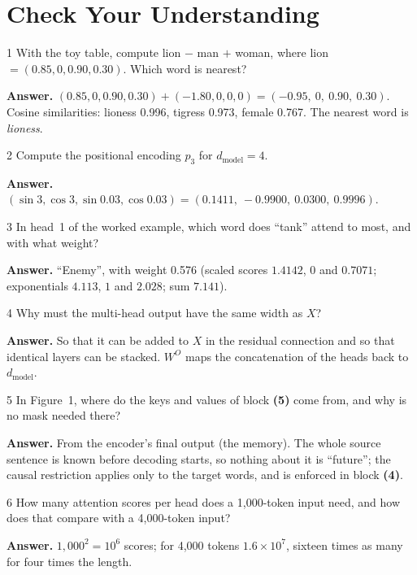 \documentclass[11pt]{article}
\newcommand{\blk}[1]{\textbf{(#1)}}
\begin{document}
\section{Check Your Understanding}
\begin{question}{1}
With the toy table, compute lion $-$ man $+$ woman, where lion $=(0.85,0,0.90,0.30)$. Which word is nearest?
\end{question}
\textbf{Answer.} $(0.85,0,0.90,0.30)+(-1.80,0,0,0)=(-0.95,\ 0,\ 0.90,\ 0.30)$. Cosine similarities: lioness 0.996, tigress 0.973, female 0.767. The nearest word is \emph{lioness}.

\begin{question}{2}
Compute the positional encoding $p_3$ for $d_{\text{model}}=4$.
\end{question}
\textbf{Answer.} $(\sin3,\cos3,\sin0.03,\cos0.03)=(0.1411,\ -0.9900,\ 0.0300,\ 0.9996)$.

\begin{question}{3}
In head~1 of the worked example, which word does ``tank'' attend to most, and with what weight?
\end{question}
\textbf{Answer.} ``Enemy'', with weight 0.576 (scaled scores $1.4142$, $0$ and $0.7071$; exponentials $4.113$, $1$ and $2.028$; sum $7.141$).

\begin{question}{4}
Why must the multi-head output have the same width as $X$?
\end{question}
\textbf{Answer.} So that it can be added to $X$ in the residual connection and so that identical layers can be stacked. $W^O$ maps the concatenation of the heads back to $d_{\text{model}}$.

\begin{question}{5}
In Figure~1, where do the keys and values of block \blk5 come from, and why is no mask needed there?
\end{question}
\textbf{Answer.} From the encoder's final output (the memory). The whole source sentence is known before decoding starts, so nothing about it is ``future''; the causal restriction applies only to the target words, and is enforced in block \blk4.

\begin{question}{6}
How many attention scores per head does a 1,000-token input need, and how does that compare with a 4,000-token input?
\end{question}
\textbf{Answer.} $1{,}000^2=10^6$ scores; for 4,000 tokens $1.6\times10^7$, sixteen times as many for four times the length.
\end{document}
